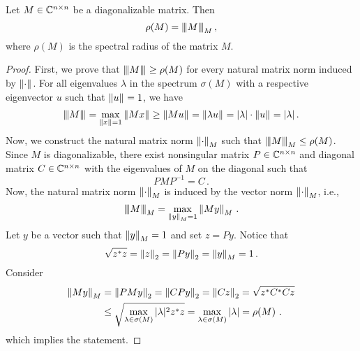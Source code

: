 \begin{theo}
\label{thm:norm}
Let $M\in\CC^{n\times n}$ be a diagonalizable matrix. Then %
$$
\rho(M)=\Mnorm{M}{M}\,,
$$
where $\rho(M)$ is the spectral radius of the matrix $M$. %
\end{theo}
\begin{proof}
First, we prove that $\Mnorm{M}{}\geq\rho(M)$ for every natural matrix norm induced by $\norm{\cdot}{}$. For all eigenvalues $\lambda$ in the spectrum $\sigma(M)$ with a respective eigenvector $u$ such that $\norm{u}{}=1$, we have
$$
\Mnorm{M}{}=\max_{\norm{x}{}=1} \norm{Mx}{}\geq \norm{Mu}{}=\norm{\lambda u}{}=|\lambda|\cdot\norm{u}{}=|\lambda|\,.
$$
Now, we construct the natural matrix norm $\norm{\cdot}{M}$ such that $\Mnorm{M}{M}\leq\rho(M)$. Since $M$ is diagonalizable, there exist nonsingular matrix $P\in\CC^{n\times n}$ and diagonal matrix $C\in\CC^{n\times n}$ with the eigenvalues of $M$ on the diagonal such that 
$$
PMP^{-1}=C\,.
$$ 
Now, the natural matrix norm $\norm{\cdot}{M}$ is induced by the vector norm $\norm{\cdot}{M}$, i.e.,
$$
\Mnorm{M}{M}=\max_{\norm{y}{M}=1} \norm{My}{M}\,.
$$
Let $y$ be a  vector such that $\norm{y}{M}=1$ and set $z=Py$. Notice that 
$$
\sqrt{z^*z}=\norm{z}{2}=\norm{Py}{2}=\norm{y}{M}=1\,.
$$
Consider
\begin{align*}
\norm{My}{M}&=\norm{PMy}{2}=\norm{CPy}{2}=\norm{Cz}{2}=\sqrt{z^*C^*Cz}\\
    &\leq \sqrt{\max_{\lambda\in\sigma(M)}|\lambda|^2 z^*z}=\max_{\lambda\in\sigma(M)}|\lambda|=\rho(M)\,\,.
\end{align*}
which implies the statement.
\end{proof}

